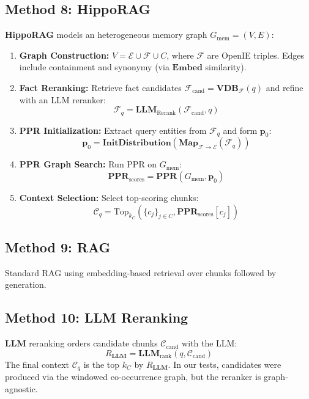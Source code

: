 \documentclass{article}
\theoremstyle{plain}
\theoremstyle{definition}
\theoremstyle{remark}
\begin{document}
\subsection{Method 8: HippoRAG}
\textbf{HippoRAG} \cite{gutierrez2025rag} models an heterogeneous memory graph $G_{\text{mem}}=(V, E)$:
\begin{enumerate}
    \item \textbf{Graph Construction:} $V = \mathcal{E} \cup \mathcal{F} \cup C$, where $\mathcal{F}$ are OpenIE triples. Edges include containment and synonymy (via $\mathbf{Embed}$ similarity).
    \item \textbf{Fact Reranking:} Retrieve fact candidates $\mathcal{F}_{\text{cand}} = \mathbf{VDB}_{\mathcal{F}}(q)$ and refine with an LLM reranker:
    \begin{equation}
    \mathcal{F}_q = \mathbf{LLM}_{\text{Rerank}}(\mathcal{F}_{\text{cand}}, q)
    \end{equation}
    \item \textbf{PPR Initialization:} Extract query entities from $\mathcal{F}_q$ and form $\mathbf{p}_0$:
    \begin{equation}
    \mathbf{p}_0 = \mathbf{InitDistribution}(\mathbf{Map}_{\mathcal{F} \to \mathcal{E}}(\mathcal{F}_q))
    \end{equation}
    \item \textbf{PPR Graph Search:} Run PPR on $G_{\text{mem}}$:
    \begin{equation}
    \mathbf{PPR}_{\text{scores}} = \mathbf{PPR}(G_{\text{mem}}, \mathbf{p}_0)
    \end{equation}
    \item \textbf{Context Selection:} Select top-scoring chunks:
    \begin{equation}
    \mathcal{C}_q = \text{Top}_{k_C}(\{c_j\}_{j\in C}, \mathbf{PPR}_{\text{scores}}[c_j])
    \end{equation}
\end{enumerate}

\subsection{Method 9: RAG}
Standard RAG using embedding-based retrieval over chunks followed by generation.

\subsection{Method 10: LLM Reranking}
\textbf{LLM} reranking orders candidate chunks $\mathcal{C}_{\text{cand}}$ with the LLM:
\begin{equation}
R_{\mathbf{LLM}} = \mathbf{LLM}_{\text{rank}}(q, \mathcal{C}_{\text{cand}})
\end{equation}
The final context $\mathcal{C}_q$ is the top $k_C$ by $R_{\mathbf{LLM}}$. In our tests, candidates were produced via the windowed co-occurrence graph, but the reranker is graph-agnostic.
\end{document}
